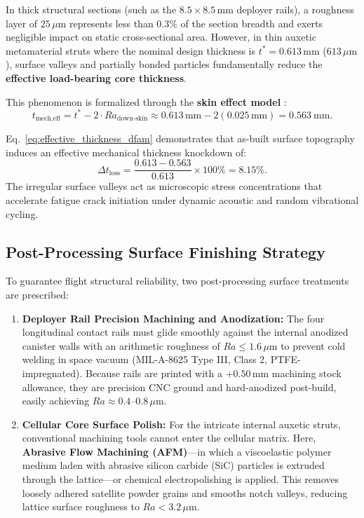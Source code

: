 In thick structural sections (such as the $8.5 \times 8.5\,\text{mm}$ deployer rails), a roughness layer of $25\,\mu\text{m}$ represents less than $0.3\%$ of the section breadth and exerts negligible impact on static cross-sectional area. However, in thin auxetic metamaterial struts where the nominal design thickness is $t^* = 0.613\,\text{mm}$ ($613\,\mu\text{m}$), surface valleys and partially bonded particles fundamentally reduce the \textbf{effective load-bearing core thickness}.

This phenomenon is formalized through the \textbf{skin effect model} \cite{collini2024}:
\begin{equation}
t_{\text{mech,eff}} = t^* - 2 \cdot Ra_{\text{down-skin}} \approx 0.613\,\text{mm} - 2(0.025\,\text{mm}) = \SI{0.563}{\milli\meter}.
\label{eq:effective_thickness_dfam}
\end{equation}

Eq.~\eqref{eq:effective_thickness_dfam} demonstrates that as-built surface topography induces an effective mechanical thickness knockdown of:
\begin{equation}
\Delta t_{\text{loss}} = \frac{0.613 - 0.563}{0.613} \times 100\% = 8.15\%.
\label{eq:thickness_reduction_pct}
\end{equation}
The irregular surface valleys act as microscopic stress concentrations that accelerate fatigue crack initiation under dynamic acoustic and random vibrational cycling.

\subsection{Post-Processing Surface Finishing Strategy}
To guarantee flight structural reliability, two post-processing surface treatments are prescribed:
\begin{enumerate}
\item \textbf{Deployer Rail Precision Machining and Anodization:} The four longitudinal contact rails must glide smoothly against the internal anodized canister walls with an arithmetic roughness of $Ra \le 1.6\,\mu\text{m}$ to prevent cold welding in space vacuum (MIL-A-8625 Type III, Class 2, PTFE-impregnated). Because rails are printed with a $+0.50\,\text{mm}$ machining stock allowance, they are precision CNC ground and hard-anodized post-build, easily achieving $Ra \approx 0.4\text{--}0.8\,\mu\text{m}$.
\item \textbf{Cellular Core Surface Polish:} For the intricate internal auxetic struts, conventional machining tools cannot enter the cellular matrix. Here, \textbf{Abrasive Flow Machining (AFM)}—in which a viscoelastic polymer medium laden with abrasive silicon carbide (SiC) particles is extruded through the lattice—or chemical electropolishing is applied. This removes loosely adhered satellite powder grains and smooths notch valleys, reducing lattice surface roughness to $Ra < 3.2\,\mu\text{m}$.
\end{enumerate}

